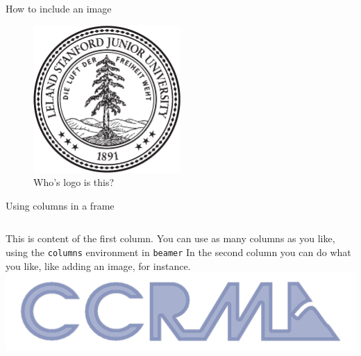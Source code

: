 \documentclass{beamer}
\begin{document}
\begin{frame}{How to include an image}
    \begin{figure}
        \includegraphics[width=0.5\textwidth]{stanford-logo.pdf}
        \caption{Who's logo is this?}
    \end{figure}
\end{frame}

\begin{frame}{Using columns in a frame}
    \begin{columns}[t]
            This is content of the first column. You can use as many columns as you like, using the \texttt{columns} environment in \texttt{beamer}
            In the second column you can do what you like, like adding an image, for instance.
            \includegraphics[width=\textwidth]{ccrma-logo.pdf}
    \end{columns}
\end{frame}
\end{document}
